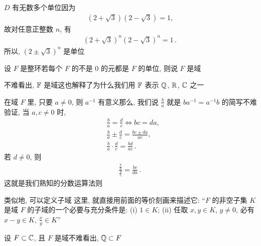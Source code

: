 \begin{example}
    $D$ 有无数多个单位\period 因为
    \begin{align*}
        (2+\sqrt{3})(2-\sqrt{3})=1,
    \end{align*}
    故对任意正整数 $n$, 有
    \begin{align*}
        (2+\sqrt{3})^n (2-\sqrt{3})^n=1 \period
    \end{align*}
    所以, $(2 \pm \sqrt{3})^n$ 是单位\period
\end{example}

\begin{definition}
    设 $F$ 是整环\period 若每个 $F$ 的不是 $0$ 的元都是 $F$ 的单位, 则说 $F$ 是域 \period
\end{definition}

\begin{example}
    不难看出, $\mathbb{F}$ 是域\period 这也解释了为什么我们用 $\mathbb{F}$ 表示 $\mathbb{Q}$, $\mathbb{R}$, $\mathbb{C}$ 之一\period
\end{example}

\begin{remark}
    在域 $F$ 里, 只要 $a \neq 0$, 则 $a^{-1}$ 有意义\period 那么, 我们说 $\frac{b}{a}$ 就是 $ba^{-1} = a^{-1}b$ 的简写\period 不难验证, 当 $a,c \neq 0$ 时,
    \begin{align*}
         & \frac{b}{a} = \frac{d}{c} \iff bc = da,              \\
         & \frac{b}{a} \pm \frac{d}{c} = \frac{bc \pm da}{ac},  \\
         & \frac{b}{a} \cdot \frac{d}{c} = \frac{bd}{ac}\period
    \end{align*}
    若 $d \neq 0$, 则
    \begin{align*}
        \frac{\frac{b}{a}}{\frac{d}{c}} = \frac{bc}{da}\period
    \end{align*}
    这就是我们熟知的分数运算法则\period
\end{remark}

\begin{remark}
    类似地, 可以定义子域 \period 这里, 就直接用前面的等价刻画来描述它: ``$F$ 的非空子集 $K$ 是域 $F$ 的子域的一个必要与充分条件是: (i) $1 \in K$; (ii) 任取 $x,y \in K$, $y \neq 0$, 必有 $x-y \in K$, $\frac{x}{y} \in K$\period ''
\end{remark}

\begin{example}
    设 $F \subset \mathbb{C}$, 且 $F$ 是域\period 不难看出, $\mathbb{Q} \subset F$\period
\end{example}
